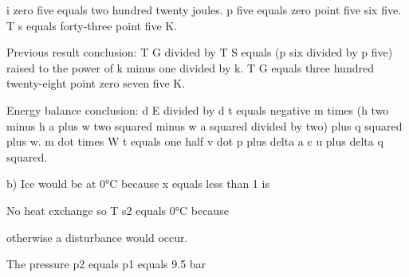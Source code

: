 i zero five equals two hundred twenty joules.  
p five equals zero point five six five.  
T s equals forty-three point five K.  

Previous result conclusion:  
T G divided by T S equals (p six divided by p five) raised to the power of k minus one divided by k.  
T G equals three hundred twenty-eight point zero seven five K.  

Energy balance conclusion:  
d E divided by d t equals negative m times (h two minus h a plus w two squared minus w a squared divided by two) plus q squared plus w.  
m dot times W t equals one half v dot p plus delta a c u plus delta q squared.

b) Ice would be at 0°C because x equals less than 1 is

No heat exchange so T s2 equals 0°C because

otherwise a disturbance would occur.

The pressure p2 equals p1 equals 9.5 bar